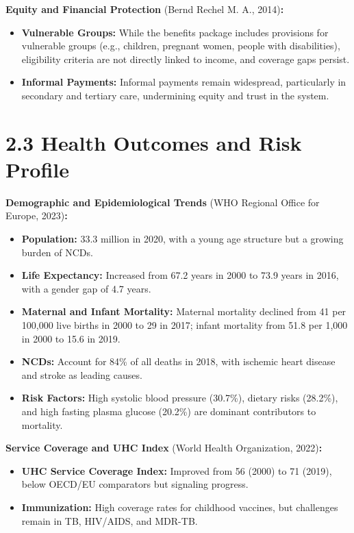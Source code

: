 \textbf{Equity and Financial Protection} (Bernd Rechel M. A.,
2014)\textbf{:}

\begin{itemize}
\item
  \textbf{Vulnerable Groups:} While the benefits package includes
  provisions for vulnerable groups (e.g., children, pregnant women,
  people with disabilities), eligibility criteria are not directly
  linked to income, and coverage gaps persist.
\item
  \textbf{Informal Payments:} Informal payments remain widespread,
  particularly in secondary and tertiary care, undermining equity and
  trust in the system.
\end{itemize}

\section{\texorpdfstring{\textbf{2.3 Health Outcomes and Risk
Profile}}{2.3 Health Outcomes and Risk Profile}}\label{health-outcomes-and-risk-profile}

\textbf{Demographic and Epidemiological Trends} (WHO Regional Office for
Europe, 2023)\textbf{:}

\begin{itemize}
\item
  \textbf{Population:} 33.3 million in 2020, with a young age structure
  but a growing burden of NCDs.
\item
  \textbf{Life Expectancy:} Increased from 67.2 years in 2000 to 73.9
  years in 2016, with a gender gap of 4.7 years.
\item
  \textbf{Maternal and Infant Mortality:} Maternal mortality declined
  from 41 per 100,000 live births in 2000 to 29 in 2017; infant
  mortality from 51.8 per 1,000 in 2000 to 15.6 in 2019.
\item
  \textbf{NCDs:} Account for 84\% of all deaths in 2018, with ischemic
  heart disease and stroke as leading causes.
\item
  \textbf{Risk Factors:} High systolic blood pressure (30.7\%), dietary
  risks (28.2\%), and high fasting plasma glucose (20.2\%) are dominant
  contributors to mortality.
\end{itemize}

\textbf{Service Coverage and UHC Index} (World Health Organization,
2022)\textbf{:}

\begin{itemize}
\item
  \textbf{UHC Service Coverage Index:} Improved from 56 (2000) to 71
  (2019), below OECD/EU comparators but signaling progress.
\item
  \textbf{Immunization:} High coverage rates for childhood vaccines, but
  challenges remain in TB, HIV/AIDS, and MDR-TB.
\end{itemize}

